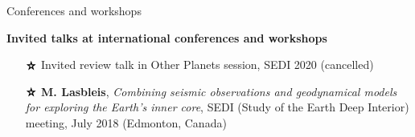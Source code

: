 \documentclass{cv}
\newcommand\openbigstar[1][0.4]{%
  \scalerel*{%
    \stackinset{c}{-.125pt}{c}{}{\scalebox{#1}{\color{white}{$\bigstar$}}}{%
      $\bigstar$}%
  }{\bigstar}
}
\begin{document}
\begin{rubrique}{Conferences and workshops}


	\textbf{Invited talks at international conferences and workshops}




	 \begin{itemize}[parsep=-2pt]
		\item[$\openbigstar$] Invited review talk in Other Planets session, SEDI 2020 (cancelled)
	\item[$\openbigstar$] \textbf{M. Lasbleis}, \textit{Combining seismic observations and geodynamical models for exploring the Earth's inner core}, SEDI (Study of the Earth Deep Interior) meeting, July 2018 (Edmonton, Canada)

\end{itemize}
\end{rubrique}
\end{document}

